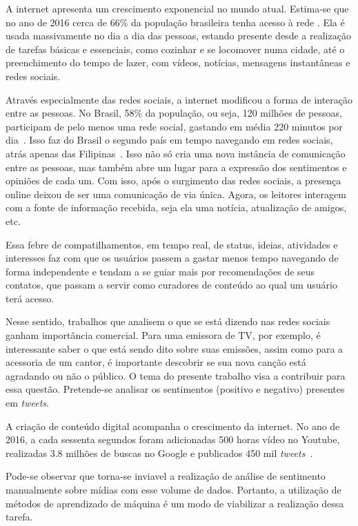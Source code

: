 
A internet apresenta um crescimento exponencial no mundo atual.
Estima-se que no ano de 2016 cerca de 66\% da população brasileira tenha acesso à rede \cite{social17}.
Ela é usada massivamente no dia a dia das pessoas, estando presente desde a realização de tarefas básicas e essenciais,
como cozinhar e se locomover numa cidade, até o preenchimento do tempo de lazer, com vídeos, notícias, mensagens
instantâneas e redes sociais.

Através especialmente das redes sociais, a internet modificou a forma de interação entre as pessoas.
No Brasil, 58\% da população, ou seja, 120 milhões de pessoas, participam de pelo menos uma rede social, gastando em
média 220 minutos por dia~\cite{social17}.
Isso faz do Brasil o segundo país em tempo navegando em redes sociais, atrás apenas das Filipinas~\cite{social17}.
Isso não só cria uma nova instância de comunicação entre as pessoas, mas também abre um lugar para a expressão dos
sentimentos e opiniões de cada um.
Com isso, após o surgimento das redes sociais, a presença online deixou de ser uma comunicação de via única.
Agora, os leitores interagem com a fonte de informação recebida, seja ela uma notícia, atualização de amigos, etc.

Essa febre de compatilhamentos, em tempo real, de status, ideias, atividades e interesses faz com que
os usuários passem a gastar menos tempo navegando de forma independente e tendam a se guiar mais por recomendações de
seus contatos, que passam a servir como curadores de conteúdo ao qual um usuário terá acesso.

Nesse sentido, trabalhos que analisem o que se está dizendo nas redes sociais ganham importância comercial.
Para uma emissora de TV, por exemplo, é interessante saber o que está sendo dito sobre suas emissões, assim como para a
acessoria de um cantor, é importante descobrir se sua nova canção está agradando ou não o público.
O tema do presente trabalho visa a contribuir para essa questão.
Pretende-se analisar os sentimentos (positivo e negativo) presentes em \textit{tweets}.

A criação de conteúdo digital acompanha o crescimento da internet.
No ano de 2016, a cada sessenta segundos foram adicionadas 500 horas vídeo no Youtube, realizadas 3.8 milhões de buscas
no Google e publicados 450 mil \textit{tweets}~\cite{smartinsights}.

Pode-se observar que torna-se inviavel a realização de análise de sentimento manualmente sobre mídias com esse volume
de dados.
Portanto, a utilização de métodos de aprendizado de máquina é um modo de viabilizar a realização dessa tarefa.


